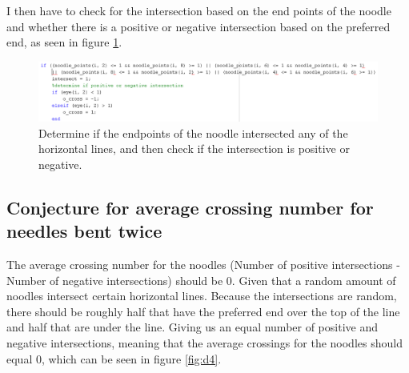 \documentclass[11pt]{article}
\begin{document}
I then have to check for the intersection based on the end points of the noodle and whether there is a positive or negative intersection based on the preferred end, as seen in figure \ref{fig:C9}.
\begin{figure}[H]
\begin{centering}
\includegraphics[scale=0.5]{f9.png}
\end{centering}
\caption{Determine if the endpoints of the noodle intersected any of the horizontal lines, and then check if the intersection is positive or negative.}
\label{fig:C9}
\end{figure}

\subsection{Conjecture for average crossing number for needles bent twice}
The average crossing number for the noodles (Number of positive intersections - Number of negative intersections) should be 0. Given that a random amount of noodles intersect certain horizontal lines. Because the intersections are random, there should be roughly half that have the preferred end over the top of the line and half that are under the line. Giving us an equal number of positive and negative intersections, meaning that the average crossings for the noodles should equal 0, which can be seen in figure \ref{fig:d4}.

\end{document}
